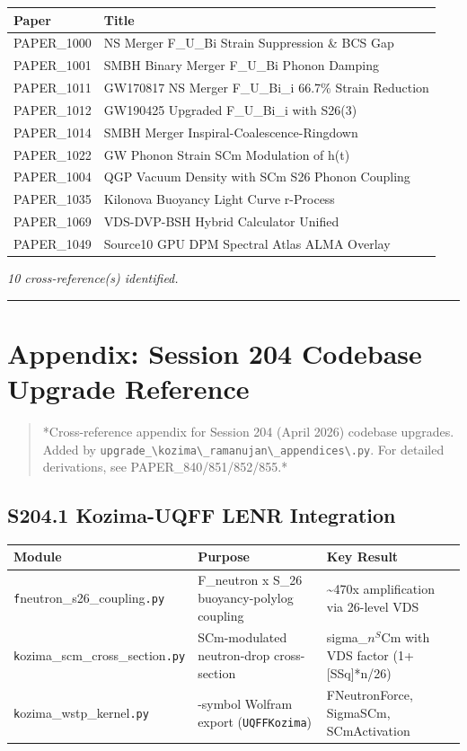 \documentclass[12pt,a4paper]{article}
\begin{document}
\begin{table}[H]
\centering
\small
\begin{tabularx}{\linewidth}{@{}>{\raggedright\arraybackslash}X>{\raggedright\arraybackslash}X@{}}
\toprule
Paper & Title \tabularnewline
\midrule
PAPER\_1000 & NS Merger F\_{U\_Bi} Strain Suppression \& BCS Gap \tabularnewline
PAPER\_1001 & SMBH Binary Merger F\_{U\_Bi} Phonon Damping \tabularnewline
PAPER\_1011 & GW170817 NS Merger F\_{U\_Bi\_i} 66.7\% Strain Reduction \tabularnewline
PAPER\_1012 & GW190425 Upgraded F\_{U\_Bi\_i} with S26(3) \tabularnewline
PAPER\_1014 & SMBH Merger Inspiral-Coalescence-Ringdown \tabularnewline
PAPER\_1022 & GW Phonon Strain SCm Modulation of h(t) \tabularnewline
PAPER\_1004 & QGP Vacuum Density with SCm S26 Phonon Coupling \tabularnewline
PAPER\_1035 & Kilonova Buoyancy Light Curve r-Process \tabularnewline
PAPER\_1069 & VDS-DVP-BSH Hybrid Calculator Unified \tabularnewline
PAPER\_1049 & Source10 GPU DPM Spectral Atlas ALMA Overlay \tabularnewline
\bottomrule
\end{tabularx}
\end{table}

\emph{10 cross-reference(s) identified.}

\medskip\hrule\medskip

\section{Appendix: Session 204 Codebase Upgrade Reference}

\begin{quote}
*Cross-reference appendix for Session 204 (April 2026) codebase upgrades.
Added by \texttt{upgrade\_\textbackslash {kozima\textbackslash \_ramanujan\textbackslash \_appendices\textbackslash }.py}. For detailed derivations,
see PAPER\_840/851/852/855.*
\end{quote}

\subsection{S204.1 Kozima-UQFF LENR Integration}

\begin{table}[H]
\centering
\small
\begin{tabularx}{\linewidth}{@{}>{\raggedright\arraybackslash}X>{\raggedright\arraybackslash}X>{\raggedright\arraybackslash}X@{}}
\toprule
Module & Purpose & Key Result \tabularnewline
\midrule
\texttt{f}neutron\_{s26\_coupling}\texttt{.py} & F\_neutron x S\_26 buoyancy-polylog coupling & \textasciitilde{}470x amplification via 26-level VDS \tabularnewline
\texttt{k}ozima\_{scm\_cross\_section}\texttt{.py} & SCm-modulated neutron-drop cross-section & sigma\_$n^{S}$Cm with VDS factor (1+[SSq]*n/26) \tabularnewline
\texttt{k}ozima\_{wstp\_kernel}\texttt{.py} & 11-symbol Wolfram export (\texttt{UQFFKozima}) & FNeutronForce, SigmaSCm, SCmActivation \tabularnewline
\bottomrule
\end{tabularx}
\end{table}
\end{document}
